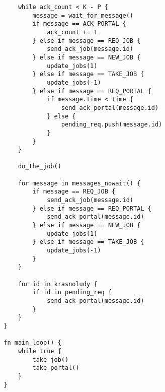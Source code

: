 \documentclass{article}
\begin{document}
\begin{verbatim}
            while ack_count < K - P {
                message = wait_for_message()
                if message == ACK_PORTAL {
                    ack_count += 1
                } else if message == REQ_JOB {
                    send_ack_job(message.id)
                } else if message == NEW_JOB {
                    update_jobs(1)
                } else if message == TAKE_JOB {
                    update_jobs(-1)
                } else if message == REQ_PORTAL {
                    if message.time < time {
                        send_ack_portal(message.id)
                    } else {
                        pending_req.push(message.id)
                    }
                }
            }

            do_the_job()

            for message in messages_nowait() {
                if message == REQ_JOB {
                    send_ack_job(message.id)
                } else if message == REQ_PORTAL {
                    send_ack_portal(message.id)
                } else if message == NEW_JOB {
                    update_jobs(1)
                } else if message == TAKE_JOB {
                    update_jobs(-1)
                }
            }

            for id in krasnoludy {
                if id in pending_req {
                    send_ack_portal(message.id)
                }
            }
        }

        fn main_loop() {
            while true {
                take_job()
                take_portal()
            }
        }
    \end{verbatim}
\end{document}
